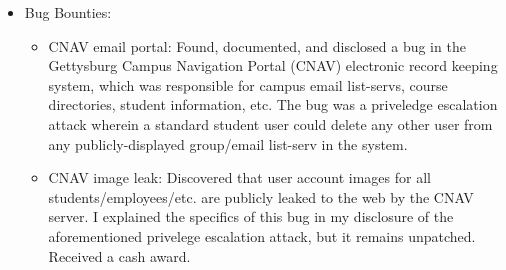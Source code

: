 \documentclass[11pt]{article}
\begin{document}
\begin{itemize}
\item Bug Bounties:
\begin{itemize}
	\item CNAV email portal: Found, documented, and disclosed a bug in the  Gettysburg Campus Navigation Portal (CNAV) electronic record keeping system, which was responsible for campus email list-servs, course directories, student information, etc. The bug was a priveledge escalation attack wherein a standard student user could delete any other user from any publicly-displayed group/email list-serv in the system.
	\item CNAV image leak: Discovered that user account images for all students/employees/etc. are publicly leaked to the web by the CNAV server. I explained the specifics of this bug in my disclosure of the aforementioned privelege escalation attack, but it remains unpatched. Received a cash award.

\end{itemize}
\end{itemize}
\end{document}
